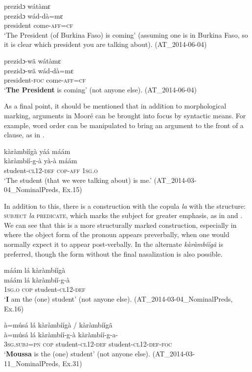 \documentclass[output=paper]{langsci/langscibook}
\begin{document}
\ea\label{ex:teo:60}
prezidɔ wátàmɛ\\
\gll prezidɔ wád-dà=mɛ \\
president come\textsc{-aff=cf}\\
\glt ‘The President (of Burkina Faso) is coming’ (assuming one is in Burkina Faso, so it is clear which president you are talking about). (AT\_2014-06-04)
\z

\ea\label{ex:teo:61}
prezidɔ-wã wátàmɛ\\
\gll prezidɔ-wã wád-dà=mɛ\\
president-\textsc{foc} come\textsc{-aff=cf}\\
\glt ‘\textbf{The President} is coming’ (not anyone else). (AT\_2014-06-04)
\z

As a final point, it should be mentioned that in addition to morphological marking, arguments in Mooré can be brought into focus by syntactic means. For example, word order can be manipulated to bring an argument to the front of a clause, as in .

\ea\label{ex:teo:62}
kàràmbíígà yáá máám\\
\gll kàràmbíí-g-à yà-à máám\\
student-\textsc{cl12-def} \textsc{cop-aff} \textsc{1sg.o}\\
\glt ‘The student (that we were talking about) is me.’ (AT\_2014-03-04\_NominalPreds, Ex.15)
\z

In addition to this, there is a construction with the copula \textit{la} with the structure: \textsc{subject} \textit{la} \textsc{predicate}, which marks the subject for greater emphasis, as in  and . We can see that this is a more structurally marked construction, especially in  where the object form of the pronoun appears preverbally, when one would normally expect it to appear post-verbally. In  the alternate \textit{kàràmbíígã} is preferred, though the form without the final nasalization is also possible. 

\ea\label{ex:teo:63}
máám lá kàràmbíígà\\
\gll máám lá kàràmbíí-g-à\\
\textsc{1sg.o} \textsc{cop} student-\textsc{cl12-def}\\
\glt ‘\textbf{I} am the (one) student’ (not anyone else). (AT\_2014-03-04\_NominalPreds, Ex.16)
\z

\ea\label{ex:teo:64}
à=músá lá kàràmbíígà / kàràmbíígã \\
\gll à=músá lá kàràmbíí-g-à kàràmbíí-g-a-{\Tilde}  \\
\textsc{3sg.subj=pn} \textsc{cop} student-\textsc{cl12-def} student-\textsc{cl12-def-foc}\\
\glt ‘\textbf{Mo}\textbf{ussa} is the (one) student’ (not anyone else). (AT\_2014-03-11\_NominalPreds, Ex.31)
\z
\end{document}
